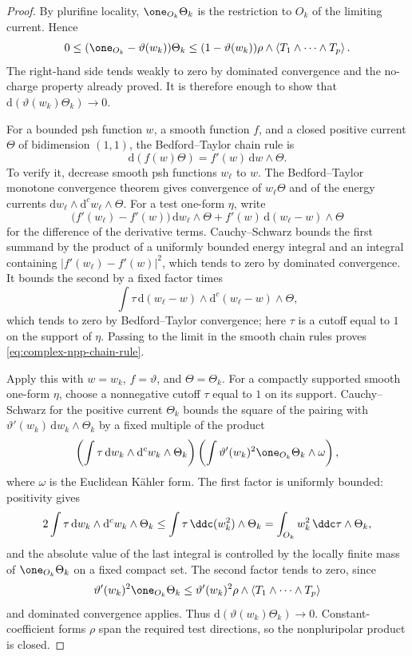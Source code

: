 \begin{proof}
By plurifine locality,
\(\one_{O_k}\Theta_k\) is the restriction to \(O_k\) of the limiting
current.  Hence
\[
 0\leq(\one_{O_k}-\vartheta(w_k))\Theta_k
 \leq(1-\vartheta(w_k))
       \rho\wedge\left\langle T_1\wedge\cdots\wedge T_p\right\rangle .
\]
The right-hand side tends weakly to zero by dominated convergence and the
no-charge property already proved.  It is therefore enough to show that
\(\mathrm d(\vartheta(w_k)\Theta_k)\to0\).

For a bounded psh function \(w\), a smooth function \(f\), and a closed
positive current \(\Theta\) of bidimension \((1,1)\), the Bedford--Taylor
chain rule is
\[
             \mathrm d(f(w)\Theta)=f'(w)\,\mathrm d w\wedge\Theta.
\tag{51.16d}\label{eq:complex-npp-chain-rule}
\]
To verify it, decrease smooth psh functions \(w_\ell\) to \(w\).  The
Bedford--Taylor monotone convergence theorem gives convergence of
\(w_\ell\Theta\) and of the energy currents
\(\mathrm d w_\ell\wedge\mathrm d^c w_\ell\wedge\Theta\).  For a test
one-form \(\eta\), write
\[
 \bigl(f'(w_\ell)-f'(w)\bigr)\,\mathrm d w_\ell\wedge\Theta
 +f'(w)\,\mathrm d(w_\ell-w)\wedge\Theta
\]
for the difference of the derivative terms.  Cauchy--Schwarz bounds the
first summand by the product of a uniformly bounded energy integral and an
integral containing \(\lvert f'(w_\ell)-f'(w)\rvert^2\), which tends to
zero by dominated convergence.  It bounds the second by a fixed factor
times
\[
 \int\tau\,\mathrm d(w_\ell-w)\wedge
                    \mathrm d^c(w_\ell-w)\wedge\Theta,
\]
which tends to zero by Bedford--Taylor convergence; here \(\tau\) is a
cutoff equal to \(1\) on the support of \(\eta\).  Passing to the limit in
the smooth chain rules proves \eqref{eq:complex-npp-chain-rule}.

Apply this with \(w=w_k\), \(f=\vartheta\), and \(\Theta=\Theta_k\).
For a compactly supported smooth one-form \(\eta\), choose a nonnegative
cutoff \(\tau\) equal to \(1\) on its support.  Cauchy--Schwarz for the
positive current \(\Theta_k\) bounds the square of the pairing with
\(\vartheta'(w_k)\,\mathrm d w_k\wedge\Theta_k\) by a fixed multiple of
the product
\[
 \left(\int\tau\,\mathrm d w_k\wedge\mathrm d^c w_k\wedge\Theta_k\right)
 \left(\int\vartheta'(w_k)^2\one_{O_k}\Theta_k\wedge\omega\right),
\]
where \(\omega\) is the Euclidean K\"ahler form.  The first factor is
uniformly bounded: positivity gives
\[
 2\int\tau\,\mathrm d w_k\wedge\mathrm d^c w_k\wedge\Theta_k
 \leq\int\tau\,\ddc(w_k^2)\wedge\Theta_k
 =\int_{O_k}w_k^2\,\ddc\tau\wedge\Theta_k,
\]
and the absolute value of the last integral is controlled by the locally
finite mass of \(\one_{O_k}\Theta_k\) on a fixed compact set.  The second
factor tends to zero, since
\[
 \vartheta'(w_k)^2\one_{O_k}\Theta_k
 \leq \vartheta'(w_k)^2
       \rho\wedge\left\langle T_1\wedge\cdots\wedge T_p\right\rangle
\]
and dominated convergence applies.  Thus
\(\mathrm d(\vartheta(w_k)\Theta_k)\to0\).  Constant-coefficient forms
\(\rho\) span the required test directions, so the nonpluripolar product is
closed.


\end{proof}
